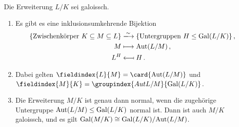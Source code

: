 \begin{theorem}
  Die Erweiterung $L/K$ sei galoissch.
  \begin{enumerate}
    \item
      Es gibt es eine inklusionsumkehrende Bijektion
      \begin{align*}
                                \{ \text{Zwischenkörper $K \subseteq M \subseteq L$} \}
        &\xlongrightarrow{\sim} \{ \text{Untergruppen $H \subgroup \Gal{L/K}$} \} \,, \\
                                M
        &\longmapsto            \Aut{L/M} \,, \\
                                L^H
        &\longmapsfrom          H \,.
      \end{align*}
    \item
      Dabei gelten $\fieldindex{L}{M} = \card{\Aut{L/M}}$ und $\fieldindex{M}{K} = \groupindex{Aut{L/M}}{\Gal{L/K}}$.
    \item
      Die Erweiterung $M/K$ ist genau dann normal, wenn die zugehörige Untergruppe $\operatorname{Aut}(L/M) \mathrel{\leq} \operatorname{Gal}(L/K)$ normal ist.
      Dann ist auch $M/K$ galoissch, und es gilt $\operatorname{Gal}(M/K) \cong \operatorname{Gal}(L/K) / {\operatorname{Aut}(L/M)}$.
  \end{enumerate}
\end{theorem}
